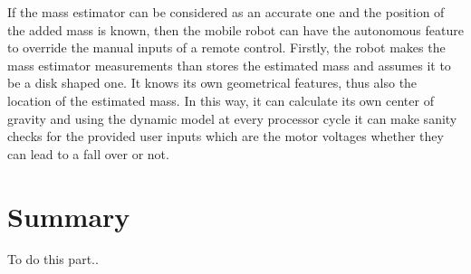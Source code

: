 \documentclass[12pt,english]{article}
\begin{document}
If the mass estimator can be considered as an accurate one and the position of the added mass is known, then the mobile robot can have the autonomous feature to override the manual inputs of a remote control. Firstly, the robot makes the mass estimator measurements than stores the estimated mass and assumes it to be a disk shaped one. It knows its own geometrical features, thus also the location of the estimated mass. In this way, it can calculate its own center of gravity and using the dynamic model at every processor cycle it can make sanity checks for the provided user inputs which are the motor voltages whether they can lead to a fall over or not.



\newpage
\newpage
\section*{Summary}
To do this part..


\newpage

\end{document}

